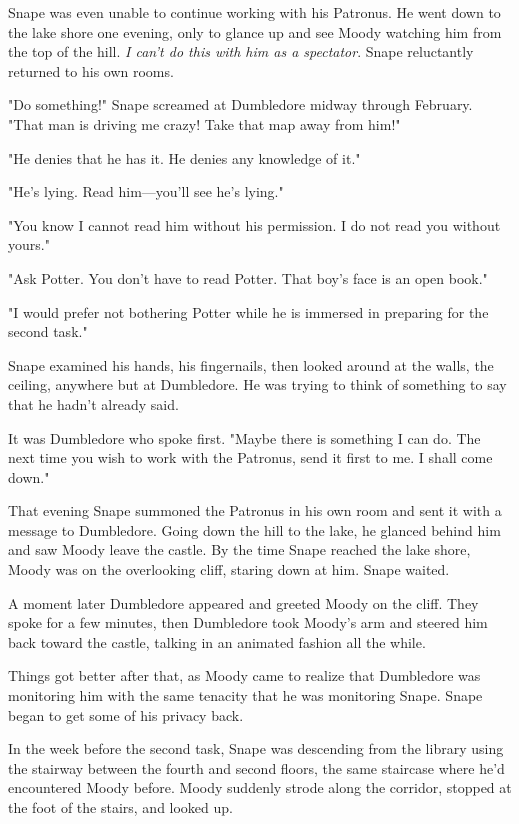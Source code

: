Snape was even unable to continue working with his Patronus. He went down to the lake shore one evening, only to glance up and see Moody watching him from the top of the hill. \emph{I can't do this with him as a spectator}. Snape reluctantly returned to his own rooms.

"Do something!" Snape screamed at Dumbledore midway through February. "That man is driving me crazy! Take that map away from him!"

"He denies that he has it. He denies any knowledge of it."

"He's lying. Read him—you'll see he's lying."

"You know I cannot read him without his permission. I do not read you without yours."

"Ask Potter. You don't have to read Potter. That boy's face is an open book."

"I would prefer not bothering Potter while he is immersed in preparing for the second task."

Snape examined his hands, his fingernails, then looked around at the walls, the ceiling, anywhere but at Dumbledore. He was trying to think of something to say that he hadn't already said.

It was Dumbledore who spoke first. "Maybe there is something I can do. The next time you wish to work with the Patronus, send it first to me. I shall come down."

That evening Snape summoned the Patronus in his own room and sent it with a message to Dumbledore. Going down the hill to the lake, he glanced behind him and saw Moody leave the castle. By the time Snape reached the lake shore, Moody was on the overlooking cliff, staring down at him. Snape waited.

A moment later Dumbledore appeared and greeted Moody on the cliff. They spoke for a few minutes, then Dumbledore took Moody's arm and steered him back toward the castle, talking in an animated fashion all the while.

Things got better after that, as Moody came to realize that Dumbledore was monitoring him with the same tenacity that he was monitoring Snape. Snape began to get some of his privacy back.

In the week before the second task, Snape was descending from the library using the stairway between the fourth and second floors, the same staircase where he'd encountered Moody before. Moody suddenly strode along the corridor, stopped at the foot of the stairs, and looked up.

